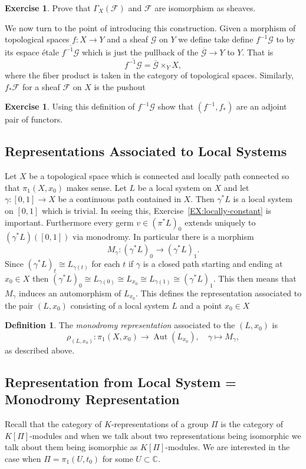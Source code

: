 \documentclass[12pt]{book}
\numberwithin{equation}{section}
\theoremstyle{definition}
\newtheorem{definition}[theorem]{Definition}
\newtheorem{exercise}[theorem]{Exercise}
\theoremstyle{remark}
\newcommand{\CC}{\mathbb{C}}
\newcommand{\Aut}{\operatorname{Aut}}
\newcommand{\Fcal}{\mathcal{F}}
\newcommand{\Gcal}{\mathcal{G}}
\begin{document}
\begin{exercise}
	Prove that $\Gamma_X(\mathcal{F})$ and $\Fcal$ are isomorphism as sheaves. 
\end{exercise}

We now turn to the point of introducing this construction. 
Given a morphism of topological spaces $f:X\to Y$ and a sheaf $\Gcal$ on $Y$ we define take define $f^{-1}\Gcal$ to by its espace \'etale $\overline{f^{-1}\Gcal}$ which is just the pullback of the $\overline{\Gcal}\to Y$ to $Y$.
That is 
$$ \overline{f^{-1}\Gcal} = \overline{\Gcal} \times_Y X,$$
where the fiber product is taken in the category of topological spaces. 
Similarly, $f_*\Fcal$ for a sheaf $\Fcal$ on $X$ is the pushout 

\begin{exercise}
	Using this definition of $f^{-1}\Gcal$ show that $(f^{-1},f_*)$ are an adjoint pair of functors. 
\end{exercise}



\subsection{Representations Associated to Local Systems}\label{S:locsys-to-repn}
Let $X$ be a topological space which is connected and locally path connected so that $\pi_1(X,x_0)$ makes sense. 
Let $L$ be a local system on $X$ and let $\gamma:[0,1] \to X$ be a continuous path contained in $X$. 
Then $\gamma^*L$ is a local system on $[0,1]$ which is trivial.
In seeing this, Exercise~\ref{EX:locally-constant} is important.
Furthermore every germ $v \in (\pi^*L)_0$ extends uniquely to $(\gamma^*L)([0,1])$ via monodromy.
In particular there is a morphism 
$$ M_{\gamma}: (\gamma^*L)_0 \to (\gamma^*L)_1.$$
Since $(\gamma^*L)_t \cong L_{\gamma(t)}$ for each $t$ if $\gamma$ is a closed path starting and ending at $x_0\in X$ then $(\gamma^*L)_0 \cong L_{\gamma(0)} \cong L_{x_0} \cong L_{\gamma(1)} \cong (\gamma^*L)_1$.
This then means that $M_{\gamma}$ induces an automorphism of $L_{x_0}$.
This defines the representation associated to the pair $(L,x_0)$ consisting of a local system $L$ and a point $x_0 \in X$
\begin{definition}
	The \emph{monodromy representation} associated to the $(L,x_0)$ is 
	$$\rho_{(L,x_0)}: \pi_1(X,x_0) \to \Aut(L_{x_0}), \quad \gamma \mapsto M_{\gamma}, $$
	as described above. 
\end{definition}

\subsection{Representation from Local System = Monodromy Representation}
Recall that the category of $K$-representations of a group $\Pi$ is the category of $K[\Pi]$-modules and when we talk about two representations being isomorphic we talk about them being isomorphic as $K[\Pi]$-modules. 
We are interested in the case when $\Pi = \pi_1(U,t_0)$ for some $U\subset \CC$. 
\end{document}
